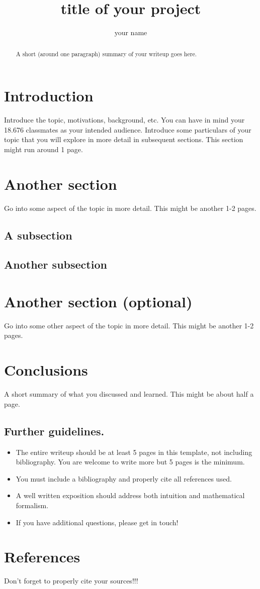 \documentclass[12pt]{amsart}
\title{title of your project}
\author{your name}
\begin{document}
\maketitle
\begin{abstract}
A short (around one paragraph) summary of your writeup goes here.
\end{abstract}
\section{Introduction}
Introduce the topic, motivations, background, etc. You can have in mind your 18.676
classmates as your intended audience. Introduce some particulars of your topic that
you will explore in more detail in subsequent sections. This section might run
around 1 page.
\section{Another section}
Go into some aspect of the topic in more detail. This might be another 1-2 pages.
\subsection{A subsection}
\subsection{Another subsection}
\section{Another section (optional)}
Go into some other aspect of the topic in more detail. This might be another 1-2
pages.
\section{Conclusions}
A short summary of what you discussed and learned. This might be about half a
page.\bigskip
\subsection*{Further guidelines.}
\begin{itemize}
\item
The entire writeup should be at least 5 pages in this template, not including
bibliography. You are welcome to write more but 5 pages is the minimum.
\item You must include a bibliography and properly cite all references used.
\item A well written exposition should address both intuition and mathematical
formalism.
\item If you have additional questions, please get in touch!
\end{itemize}
\section*{References}
Don't forget to properly cite your sources!!!
\end{document}
